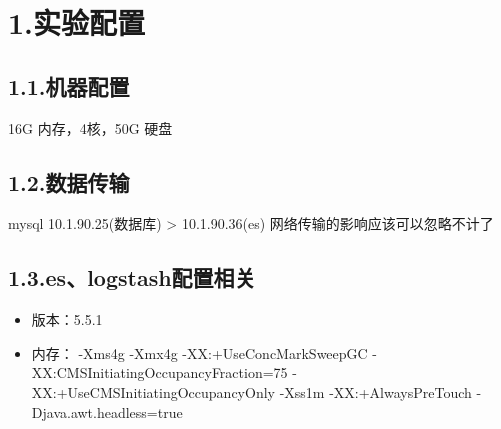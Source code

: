 \documentclass{article}
\begin{document}
\section{1.\hspace*{0.5em}实验配置}\label{section}%

\subsection{1.1.\hspace*{0.5em}机器配置}\label{section}%

\noindent{}16G 内存，4核，50G 硬盘%

\subsection{1.2.\hspace*{0.5em}数据传输}\label{section}%

\noindent{}mysql 10.1.90.25(数据库) \textendash{}\textgreater{} 10.1.90.36(es)    \mdbr
{}网络传输的影响应该可以忽略不计了%

\subsection{1.3.\hspace*{0.5em}es、logstash配置相关}\label{sec-eslogstash}%

\begin{itemize}[noitemsep,topsep=\mdcompacttopsep]%

\item{}版本：5.5.1     %

\item{}内存：         \mdbr
{}-Xms4g     \mdbr
{}-Xmx4g           \mdbr
{}-XX:+UseConcMarkSweepGC               \mdbr
{}-XX:CMSInitiatingOccupancyFraction=75             \mdbr
{}-XX:+UseCMSInitiatingOccupancyOnly            \mdbr
{}-Xss1m       \mdbr
{}-XX:+AlwaysPreTouch     \mdbr
{}-Djava.awt.headless=true             %
\end{itemize}%
\end{document}
